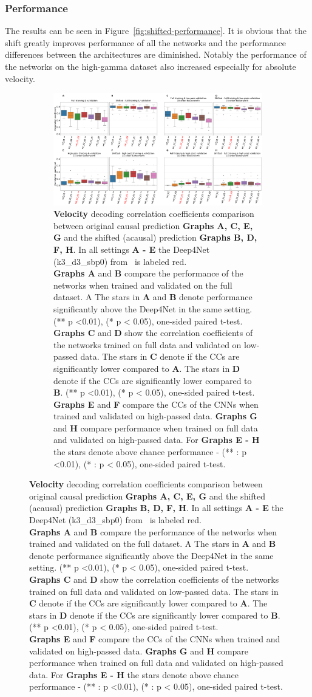 \subsubsection{Performance}
The results can be seen in Figure~\ref{fig:shifted-performance}.
It is obvious that the shift greatly improves performance of all the networks and the performance differences between the architectures are diminished.
Notably the performance of the networks on the high-gamma dataset also increased especially for absolute velocity.
\begin{figure}[!htpb]
\centering
\begin{subfigure}[t]{\textwidth}
   \includegraphics[width=1\linewidth]{img/ch4/shifted_vs_non_shifted_vel_performance_comparison}
   \caption{\textbf{Velocity} decoding correlation coefficients comparison between original causal prediction \textbf{Graphs A, C, E, G} and the shifted (acausal) prediction \textbf{Graphs B, D, F, H}. In all settings \textbf{
   A - E} the Deep4Net (k3\_d3\_sbp0) from~\cite{Hammer-2021} is labeled red.\\ \textbf{Graphs A} and \textbf{B} compare the performance of the networks when trained and validated on the full dataset. A The stars in \textbf{A} and \textbf{B} denote performance significantly above the Deep4Net in the same setting. (** p <0.01), (* p < 0.05), one-sided paired t-test.
   \\\textbf{Graphs C} and \textbf{D} show the correlation coefficients of the networks trained on full data and validated on low-passed data. 
   The stars in \textbf{C} denote if the CCs are significantly lower compared to \textbf{A}. The stars in \textbf{D} denote if the CCs are significantly lower compared to \textbf{B}. (** p <0.01), (* p < 0.05), one-sided paired t-test.
   \\\textbf{Graphs E} and \textbf{F} compare the CCs of the CNNs when trained and validated on high-passed data. \textbf{Graphs G} and \textbf{H} compare performance when trained on full data and validated on high-passed data. For \textbf{Graphs E - H} the stars denote above chance performance - (** : p <0.01), (* : p < 0.05), one-sided paired t-test.}
\end{subfigure}\label{fig:shifted-performance-vel}
\end{figure}
\clearpage   

